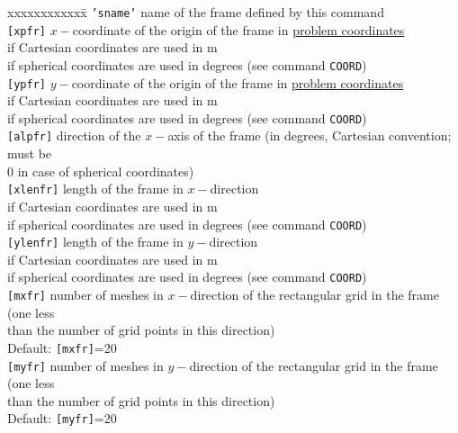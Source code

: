 \documentclass[12pt]{book}
\begin{document}
\begin{tabbing}
xxxxxxxxxxxx\= \kill
{\tt {'sname'}} \> name of the frame defined by this command\\
{\tt [xpfr]}    \> $x-$coordinate of the origin of the frame in \underline{problem coordinates}\+\\
                   if Cartesian coordinates are used in m\\
                   if spherical coordinates are used in degrees (see command {\tt COORD})\-\\
{\tt [ypfr]}    \> $y-$coordinate of the origin of the frame in \underline{problem coordinates}\+\\
                   if Cartesian coordinates are used in m\\
                   if spherical coordinates are used in degrees (see command {\tt COORD})\-\\
{\tt [alpfr]}   \> direction of the $x-$axis of the frame (in degrees, Cartesian convention; must be\+\\
                   0 in case of spherical coordinates)\-\\
{\tt [xlenfr]}  \> length of the frame in $x-$direction\+\\
                   if Cartesian coordinates are used in m\\
                   if spherical coordinates are used in degrees (see command {\tt COORD})\-\\
{\tt [ylenfr]}  \> length of the frame in $y-$direction\+\\
                   if Cartesian coordinates are used in m\\
                   if spherical coordinates are used in degrees (see command {\tt COORD})\-\\
{\tt [mxfr]}    \> number of meshes in $x-$direction of the rectangular grid in the frame (one less\+\\
                   than the number of grid points in this direction)\\
                   Default: {\tt [mxfr]}=20\-\\
{\tt [myfr]}    \> number of meshes in $y-$direction of the rectangular grid in the frame (one less\+\\
                   than the number of grid points in this direction)\\
                   Default: {\tt [myfr]}=20\-\\
\end{tabbing}
\end{document}
